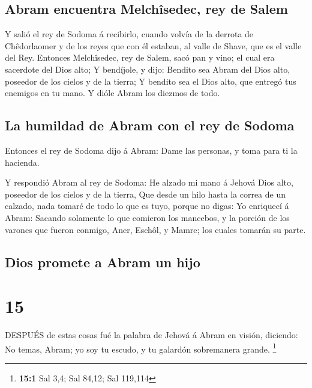 \hypertarget{abram-encuentra-melchuxeesedec-rey-de-salem}{%
\subsection{Abram encuentra Melchîsedec, rey de
Salem}\label{abram-encuentra-melchuxeesedec-rey-de-salem}}

 Y salió el rey de Sodoma á recibirlo, cuando volvía de la
derrota de Chêdorlaomer y de los reyes que con él estaban, al valle de
Shave, que es el valle del Rey.  Entonces Melchîsedec, rey
de Salem, sacó pan y vino; el cual era sacerdote del Dios alto;
 Y bendíjole, y dijo: Bendito sea Abram del Dios alto,
poseedor de los cielos y de la tierra;  Y bendito sea el
Dios alto, que entregó tus enemigos en tu mano. Y dióle Abram los
diezmos de todo.

\hypertarget{la-humildad-de-abram-con-el-rey-de-sodoma}{%
\subsection{La humildad de Abram con el rey de
Sodoma}\label{la-humildad-de-abram-con-el-rey-de-sodoma}}

 Entonces el rey de Sodoma dijo á Abram: Dame las personas,
y toma para ti la hacienda.

 Y respondió Abram al rey de Sodoma: He alzado mi mano á
Jehová Dios alto, poseedor de los cielos y de la tierra, 
Que desde un hilo hasta la correa de un calzado, nada tomaré de todo lo
que es tuyo, porque no digas: Yo enriquecí á Abram: 
Sacando solamente lo que comieron los mancebos, y la porción de los
varones que fueron conmigo, Aner, Eschôl, y Mamre; los cuales tomarán su
parte.

\hypertarget{dios-promete-a-abram-un-hijo}{%
\subsection{Dios promete a Abram un
hijo}\label{dios-promete-a-abram-un-hijo}}

\hypertarget{section-14}{%
\section{15}\label{section-14}}

 DESPUÉS de estas cosas fué la palabra de Jehová á Abram en
visión, diciendo: No temas, Abram; yo soy tu escudo, y tu galardón
sobremanera grande. \footnote{\textbf{15:1} Sal 3,4; Sal 84,12; Sal
  119,114}

